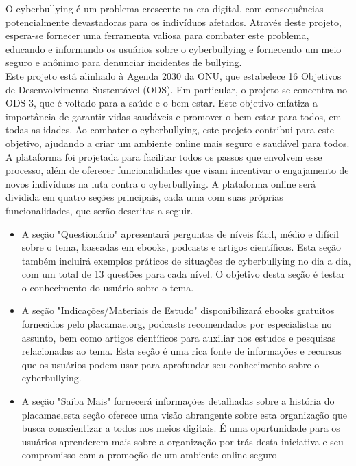 O cyberbullying é um problema crescente na era digital, com consequências potencialmente devastadoras para os indivíduos afetados. Através deste projeto, espera-se fornecer uma ferramenta valiosa para combater este problema, educando e informando os usuários sobre o cyberbullying e fornecendo um meio seguro e anônimo para denunciar incidentes de bullying.\\

Este projeto está alinhado à Agenda 2030 da ONU, que estabelece 16 Objetivos de Desenvolvimento Sustentável (ODS). Em particular, o projeto se concentra no ODS 3, que é voltado para a saúde e o bem-estar. Este objetivo enfatiza a importância de garantir vidas saudáveis e promover o bem-estar para todos, em todas as idades. Ao combater o cyberbullying, este projeto contribui para este objetivo, ajudando a criar um ambiente online mais seguro e saudável para todos.\\

A plataforma foi projetada para facilitar todos os passos que envolvem esse processo, além de oferecer funcionalidades que visam incentivar o engajamento de novos indivíduos na luta contra o cyberbullying. A plataforma online será dividida em quatro seções principais, cada uma com suas próprias funcionalidades, que serão descritas a seguir.

\begin{itemize}
    \item A seção "Questionário" apresentará perguntas de níveis fácil, médio e difícil sobre o tema, baseadas em ebooks, podcasts e artigos científicos. Esta seção também incluirá exemplos práticos de situações de cyberbullying no dia a dia, com um total de 13 questões para cada nível. O objetivo desta seção é testar o conhecimento do usuário sobre o tema.

    \item A seção "Indicações/Materiais de Estudo" disponibilizará ebooks gratuitos fornecidos pelo placamae.org, podcasts recomendados por especialistas no assunto, bem como artigos científicos para auxiliar nos estudos e pesquisas relacionadas ao tema. Esta seção é uma rica fonte de informações e recursos que os usuários podem usar para aprofundar seu conhecimento sobre o cyberbullying.
    \item A seção "Saiba Mais" fornecerá informações detalhadas sobre a história do placamae,esta seção oferece uma visão abrangente sobre esta organização que busca conscientizar a todos nos meios digitais. É uma oportunidade para os usuários aprenderem mais sobre a organização por trás desta iniciativa e seu compromisso com a promoção de um ambiente online seguro

\end{itemize}

